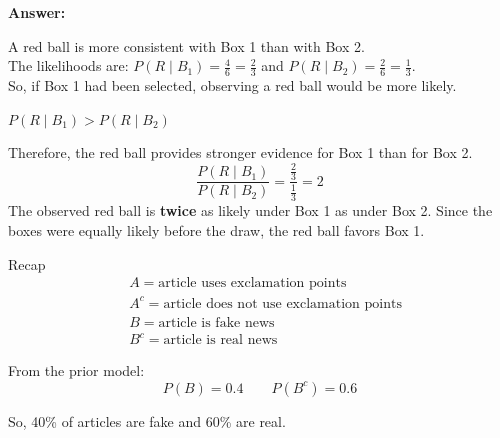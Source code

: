 \documentclass[12pt]{beamer}
\begin{document}
{\begin{frame}{}
\begin{block}{}
\begin{center}
\begin{tikzpicture}[scale=1]
\end{tikzpicture}
\end{center}
\end{block}
\end{frame}

\begin{frame}{}
\begin{block}{}
\small
\textbf{Answer:}
{\color{blue}
A red ball is more consistent with Box 1 than with Box 2.\\[.1cm]

The likelihoods are:
$P(R\mid B_1)=\frac46=\frac23$
and
$P(R\mid B_2)=\frac26=\frac13.$\\[.1cm]

So, if Box 1 had been selected, observing a red ball would be more likely.

\begin{center}
$P(R\mid B_1) > P(R\mid B_2)$
\end{center}

Therefore, the red ball provides stronger evidence for Box 1 than for Box 2.
\[
\frac{P(R\mid B_1)}{P(R\mid B_2)} = \frac{\frac23}{\frac13} = 2
\]
The observed red ball is \textbf{twice} as likely under Box 1 as under Box 2. Since the boxes were equally likely before the draw, the red ball favors Box 1.
}
\end{block}
\end{frame}
}

\begin{frame}{}
\begin{block}{Recap}
\[
\begin{aligned}
&A   = \text{article uses exclamation points}\\
&A^c = \text{article does not use exclamation points}\\
&B    = \text{article is fake news}\\
&B^c  = \text{article is real news}
\end{aligned}
\]
\vspace{0.2cm}

From the prior model:
\[
P(B)=0.4
\qquad
P(B^c)=0.6
\]

So, 40\% of articles are fake and 60\% are real.
\end{block}
\end{frame}
\end{document}
